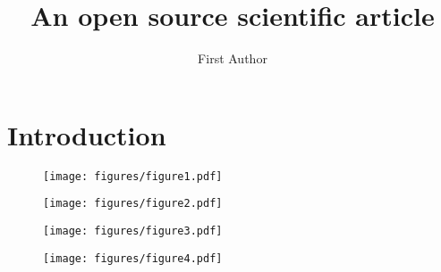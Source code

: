 \documentclass[twocolumn]{aastex631}
\begin{document}
\title{An open source scientific article}

\author{First Author}

\begin{abstract}
    \blindtext
\end{abstract}

\section{Introduction}

\blindtext

\begin{figure}[ht!]
    \begin{centering}
        \texttt{[image: figures/figure1.pdf]}
        \caption{
            \blindtext
        }
        \label{fig:figure1}
    \end{centering}
\end{figure}

\begin{figure}[ht!]
    \begin{centering}
        \texttt{[image: figures/figure2.pdf]}
        \caption{
            \blindtext
        }
        \label{fig:figure2}
    \end{centering}
\end{figure}

\begin{figure}[ht!]
    \begin{centering}
        \texttt{[image: figures/figure3.pdf]}
        \caption{
            \blindtext
        }
        \label{fig:figure3}
    \end{centering}
\end{figure}

\begin{figure}[ht!]
    \begin{centering}
        \texttt{[image: figures/figure4.pdf]}
        \caption{
            \blindtext
        }
        \label{fig:figure4}
    \end{centering}
\end{figure}
\end{document}
